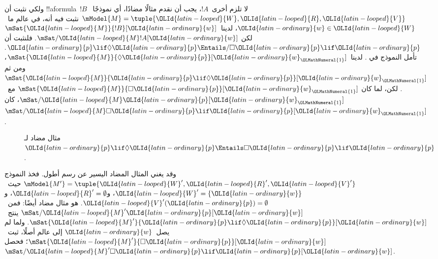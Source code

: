 \documentclass[../../../include/open-logic-section]{subfiles}
\begin{document}
\begin{ex}
  ولكي نثبت أن !!a{formula}~$!B$ لا تلزم أخرى~$!A$، يجب أن نقدم
  مثالًا مضادًا، أي نموذجًا~$\mModel{M} = \tuple{\OLId{latin-looped}{W}, \OLId{latin-looped}{R}, \OLId{latin-looped}{V}}$ نثبت فيه
  أنه، في عالم ما~$\OLId{latin-ordinary}{w} \in \OLId{latin-looped}{W}$، لدينا~$\mSat{\OLId{latin-looped}{M}}{!B}[\OLId{latin-ordinary}{w}]$ لكن
  $\mSat/{\OLId{latin-looped}{M}}{!A}[\OLId{latin-ordinary}{w}]$. فلنثبت أن
  $\OLId{latin-ordinary}{p} \lif \Diamond \OLId{latin-ordinary}{p} \Entails/ \Box \OLId{latin-ordinary}{p} \lif \OLId{latin-ordinary}{p}$. تأمل النموذج في
  . لدينا~$\mSat{\OLId{latin-looped}{M}}{\Diamond \OLId{latin-ordinary}{p}}[\OLId{latin-ordinary}{w}_\OLMathNumeral{1}]$، ومن ثم
  $\mSat{\OLId{latin-looped}{M}}{\OLId{latin-ordinary}{p} \lif \Diamond \OLId{latin-ordinary}{p}}[\OLId{latin-ordinary}{w}_\OLMathNumeral{1}]$. لكن، لما كان
  $\mSat{\OLId{latin-looped}{M}}{\Box \OLId{latin-ordinary}{p}}[\OLId{latin-ordinary}{w}_\OLMathNumeral{1}]$ مع~$\mSat/{\OLId{latin-looped}{M}}{\OLId{latin-ordinary}{p}}[\OLId{latin-ordinary}{w}_\OLMathNumeral{1}]$، كان
  $\mSat/{\OLId{latin-looped}{M}}{\Box \OLId{latin-ordinary}{p} \lif \OLId{latin-ordinary}{p}}[\OLId{latin-ordinary}{w}_\OLMathNumeral{1}]$.
  \begin{figure}
  \begin{center}
  \end{center}
  \caption{مثال مضاد لـ$\OLId{latin-ordinary}{p} \lif \Diamond \OLId{latin-ordinary}{p}
  \Entails \Box \OLId{latin-ordinary}{p} \lif \OLId{latin-ordinary}{p}$.}
  \end{figure}

  وقد يغني المثال المضاد اليسير عن رسم أطول. فخذ النموذج
  $\mModel{M'} = \tuple{\OLId{latin-looped}{W}', \OLId{latin-looped}{R}', \OLId{latin-looped}{V}'}$ حيث~$\OLId{latin-looped}{W}' = \{\OLId{latin-ordinary}{w}\}$،
  و$\OLId{latin-looped}{R}' = \emptyset$، و$\OLId{latin-looped}{V}'(\OLId{latin-ordinary}{p}) = \emptyset$. هو مثال مضاد أيضًا:
  فمن~$\mSat/{\OLId{latin-looped}{M}'}{\OLId{latin-ordinary}{p}}[\OLId{latin-ordinary}{w}]$ ينتج~$\mSat{\OLId{latin-looped}{M}'}{\OLId{latin-ordinary}{p} \lif \Diamond \OLId{latin-ordinary}{p}}[\OLId{latin-ordinary}{w}]$.
  ولما لم يصل~$\OLId{latin-ordinary}{w}$ إلى عالم أصلًا، ثبت~$\mSat{\OLId{latin-looped}{M}'}{\Box \OLId{latin-ordinary}{p}}[\OLId{latin-ordinary}{w}]$؛
  فحصل~$\mSat/{\OLId{latin-looped}{M}'}{\Box \OLId{latin-ordinary}{p} \lif \OLId{latin-ordinary}{p}}[\OLId{latin-ordinary}{w}]$.
\end{ex}
\end{document}

